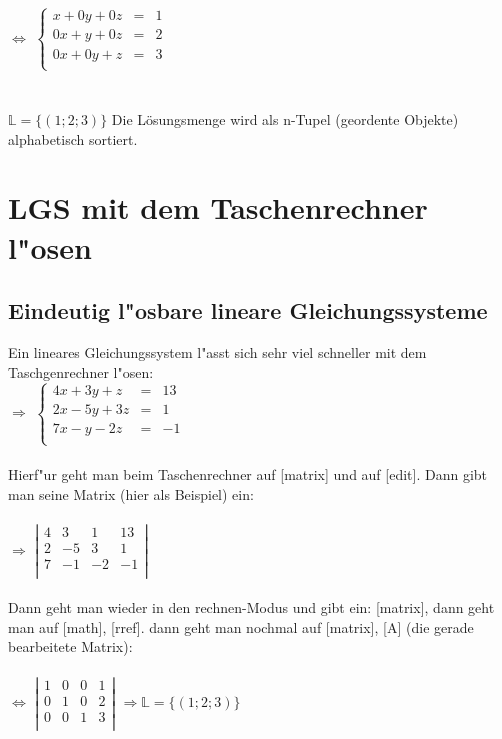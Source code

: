 \documentclass[main.tex]{subfiles}
\begin{document}
\\
\\
$\Leftrightarrow$ $\left\{ \begin{array}{rcl}
x+0y+0z&=&1\\
0x+y+0z&=&2\\
0x+0y+z&=&3\\
\end{array}\right.$\\
\\
\\
$\mathbb{L}=\{(1;2;3) \}$ Die Lösungsmenge wird als n-Tupel (geordente Objekte) alphabetisch sortiert.

	\section{LGS mit dem Taschenrechner l"osen}

	\subsection{Eindeutig l"osbare lineare Gleichungssysteme}

Ein lineares Gleichungssystem l"asst sich sehr viel schneller mit dem Taschgenrechner l"osen:\\

$\Rightarrow$ $\left\{ \begin{array}{rcl}
4x+3y+z&=&13\\
2x-5y+3z& =& 1\\
7x-y-2z&=&-1\\
\end{array}\right.$\\
\\
Hierf"ur geht man beim Taschenrechner auf [matrix] und auf [edit]. Dann gibt man seine Matrix (hier als Beispiel) ein:\\
\\
$\Rightarrow$ $\left\vert \begin{array}{rccl}
4&3&1&13\\
2&-5&3& 1 \\
7&-1&-2&-1\\
\end{array}\right\vert$\\
\\
Dann geht man wieder in den rechnen-Modus und gibt ein:  [matrix], dann geht man auf [math], [rref]. dann geht man nochmal auf [matrix], [A] (die gerade bearbeitete Matrix):\\
\\
$\Leftrightarrow$ $\left\vert \begin{array}{rccl}
1&0&0&1\\
0&1&0&2 \\
0&0&1&3\\
\end{array}\right\vert$ \qquad $\Rightarrow \mathbb{L}=\{(1;2;3) \}$ \\
\end{document}
